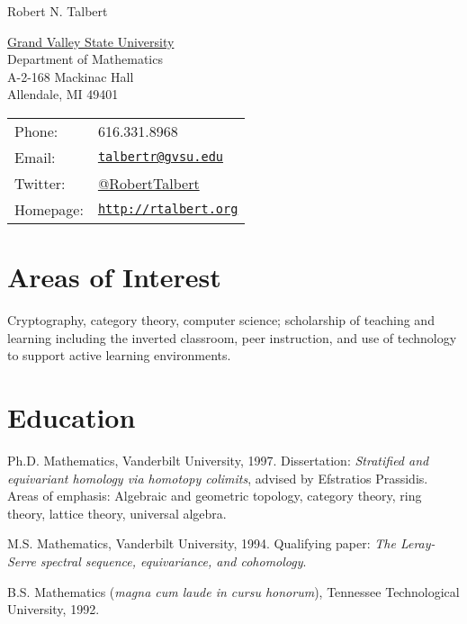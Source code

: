 \documentclass[letterpaper]{article}
\def\name{Robert N. Talbert}
\renewenvironment{itemize}{
  \begin{list}{}{
    \setlength{\leftmargin}{1.5em}
	\setlength{\itemsep}{0in}
  }
}{
  \end{list}
}
\begin{document}
{\Large \name}


\vspace{0.25in}

\begin{minipage}{0.45\linewidth}
  \href{http://www.gvsu.edu/}{Grand Valley State University} \\
  Department of Mathematics \\
  A-2-168 Mackinac Hall \\
  Allendale, MI 49401
\end{minipage}
\begin{minipage}{0.45\linewidth}
  \begin{tabular}{ll}
    Phone: & 616.331.8968 \\
    Email: & \href{mailto:talbertr@gvsu.edu}{\tt talbertr@gvsu.edu} \\
	Twitter: & \href{http://www.twitter.com/RobertTalbert}{@RobertTalbert} \\
    Homepage: & \href{http://faculty.gvsu.edu/talbertr/}{\tt http://rtalbert.org} \\
  \end{tabular}
\end{minipage}


\section*{Areas of Interest}

Cryptography, category theory, computer science; scholarship of teaching and learning including the inverted classroom, peer instruction, and use of technology to support active learning environments.

\section*{Education}

\begin{itemize}
  \item Ph.D. Mathematics, Vanderbilt University, 1997. Dissertation: \emph{Stratified and equivariant homology via homotopy colimits}, advised by Efstratios Prassidis. Areas of emphasis: Algebraic and geometric topology, category theory, ring theory, lattice theory, universal algebra.


  \item M.S. Mathematics, Vanderbilt University, 1994. Qualifying paper: \emph{The Leray-Serre spectral sequence, equivariance, and cohomology}. 

  \item B.S. Mathematics (\emph{magna cum laude in cursu honorum}), Tennessee Technological University, 1992. 

\end{itemize}
\end{document}
